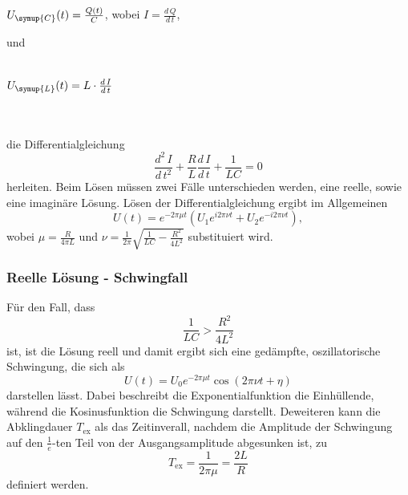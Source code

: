         \centerline{$U_{\symup{C}}(t) = \frac{Q(t)}{C}$, wobei $I = \frac{d \, Q}{d \, t}$,}
        und
        \\ \\
        \centerline{$U_{\symup{L}}(t) = L \cdot \frac {d \, I} {d \, t} $}
        \\ \\
        die Differentialgleichung 
        \begin{equation}
            \label{eqn:diffgleichung}
            \frac{d^2 \, I}{d \, t^2} + \frac{R}{L} \frac{d \, I}{d \, t} + \frac {1}{L C} = 0
        \end{equation}
        herleiten. Beim Lösen müssen zwei Fälle unterschieden werden, eine reelle, sowie eine imaginäre Lösung. 
        Lösen der Differentialgleichung ergibt im Allgemeinen
        \begin{equation} 
            \label{eqn:strom_allgemein}
            U(t) = e^{-2 \pi \mu t} (U_1 e^{i 2 \pi \nu t} + U_2 e^{-i 2 \pi \nu t}) ,
        \end{equation}
        wobei $\mu = \frac{R}{4 \pi L} $ und $\nu = \frac{1}{2 \pi} \sqrt{\frac{1}{L C} - \frac{R^2}{4 L^2} }$
        substituiert wird.
        \subsubsection{Reelle Lösung - Schwingfall}
            Für den Fall, dass
            \begin{equation}
                \label{eqn:bedingung_reell}
                \frac{1}{L C} > \frac{R^2}{4 L^2}
            \end{equation}
            ist, ist die Lösung reell und damit ergibt sich eine gedämpfte, oszillatorische Schwingung, die sich als
            \begin{equation}
                \label{eqn:reell_lösung}
                U(t) = U_0 e^{-2 \pi \mu t} \cos(2 \pi \nu t + \eta) 
            \end{equation}
            darstellen lässt. Dabei beschreibt die Exponentialfunktion die Einhüllende, während die Kosinusfunktion die Schwingung darstellt.
            Deweiteren kann die Abklingdauer $T_\text{ex}$ als das Zeitinverall, nachdem die Amplitude der Schwingung auf den $\frac{1}{e}$-ten Teil
            von der Ausgangsamplitude abgesunken ist, zu
            \begin{equation}
                \label{eqn:abklingdauer}
                T_\text{ex} = \frac{1}{2 \pi \mu} = \frac{2 L}{R}
            \end{equation}
            definiert werden.

